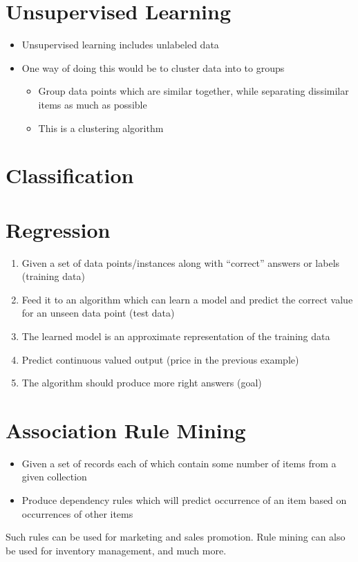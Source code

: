 \section{Unsupervised Learning}
\begin{itemize}
    \item Unsupervised learning includes unlabeled data
    \item One way of doing this would be to cluster data into to groups
    \begin{itemize}
        \item Group data points which are similar together, while separating 
        dissimilar items as much as possible
        \item This is a clustering algorithm
    \end{itemize}
\end{itemize}


\section{Classification}
\section{Regression}
\begin{enumerate}
    \item Given a set of data points/instances along with “correct” answers or 
    labels (training data)
    \item Feed it to an algorithm which can learn a model and predict the 
    correct value for an unseen data point (test data)
    \item The learned model is an approximate representation of the training 
    data
    \item Predict continuous valued output (price in the previous example)
    \item The algorithm should produce more right answers (goal)
\end{enumerate}


\section{Association Rule Mining}
\begin{itemize}
    \item Given a set of records each of which contain some number of items from a given collection
    \item Produce dependency rules which will predict occurrence of an item based on occurrences of other items
\end{itemize}
Such rules can be used for marketing and sales promotion. Rule mining can also be used for inventory management, and much more.

